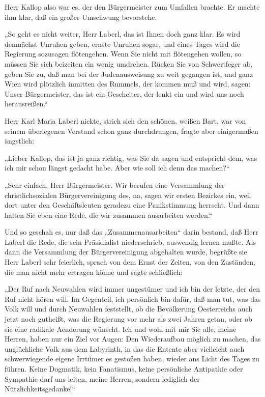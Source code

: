 Herr Kallop also war es, der den Bürgermeister zum Umfallen
brachte. Er machte ihm klar, daß ein großer Umschwung bevorstehe.

„So geht es nicht weiter, Herr Laberl, das ist Ihnen doch ganz
klar. Es wird demnächst Unruhen geben, ernste 
Unruhen sogar, und eines Tages wird die Regierung sozusagen
flötengehen. Wenn Sie nicht mit flötengehen wollen, so müssen Sie
sich beizeiten ein wenig umdrehen. Rücken Sie von Schwertfeger ab,
geben Sie zu, daß man bei der Judenausweisung zu weit gegangen ist,
und ganz Wien wird plötzlich inmitten des Rummels, der kommen muß
und wird, sagen: Unser Bürgermeister, das ist ein Gescheiter, der
lenkt ein und wird uns noch herausreißen.“

Herr Karl Maria Laberl nickte, strich sich den schönen, weißen
Bart, war von seinem überlegenen Verstand schon ganz durchdrungen,
fragte aber einigermaßen ängstlich:

„Lieber Kallop, das ist ja ganz richtig, was Sie da sagen und
entspricht dem, was ich mir schon längst gedacht habe. Aber wie
soll ich denn das machen?“

„Sehr einfach, Herr Bürgermeister. Wir berufen eine Versammlung der
christlichsozialen Bürgervereinigung des, na, sagen wir ersten
Bezirkes ein, weil dort unter den Geschäftsleuten geradezu eine
Panikstimmung herrscht. Und dann halten Sie eben eine Rede, die wir
zusammen ausarbeiten werden.“

Und so geschah es, nur daß das „Zusammenausarbeiten“ darin bestand,
daß Herr Laberl die Rede, die sein Präsidialist niederschrieb,
auswendig lernen mußte. Als dann die Versammlung der
Bürgervereinigung abgehalten wurde, begrüßte sie Herr Laberl sehr
feierlich, sprach von dem Ernst der Zeiten, von den Zuständen, die
man nicht mehr ertragen könne und sagte schließlich:

„Der Ruf nach Neuwahlen wird immer ungestümer und ich bin der
letzte, der den Ruf nicht hören will. Im 
Gegenteil, ich persönlich bin dafür, daß man tut, was das Volk will
und durch Neuwahlen feststellt, ob die Bevölkerung Oesterreichs
auch jetzt noch gutheißt, was die Regierung vor mehr als zwei
Jahren getan, oder ob sie eine radikale Aenderung wünscht. Ich und
wohl mit mir Sie alle, meine Herren, haben nur ein Ziel vor Augen:
Den Wiederaufbau möglich zu machen, das unglückliche Volk aus dem
Labyrinth, in das die Entente aber vielleicht auch schwerwiegende
eigene Irrtümer es gestoßen haben, wieder ans Licht des Tages zu
führen. Keine Dogmatik, kein Fanatismus, keine persönliche
Antipathie oder Sympathie darf uns leiten, meine Herren, sondern
lediglich der Nützlichkeitsgedanke!“

